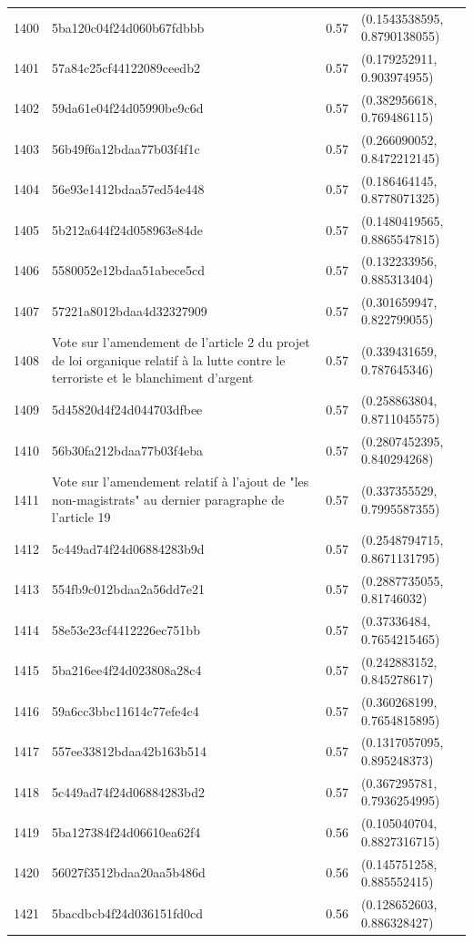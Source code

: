 \begin{table}[ht]
\begin{tabular}{rlrl}
  1400 & 5ba120c04f24d060b67fdbbb & 0.57 & (0.1543538595, 0.8790138055) \\ 
  1401 & 57a84c25cf44122089ceedb2 & 0.57 & (0.179252911, 0.903974955) \\ 
  1402 & 59da61e04f24d05990be9c6d & 0.57 & (0.382956618, 0.769486115) \\ 
  1403 & 56b49f6a12bdaa77b03f4f1c & 0.57 & (0.266090052, 0.8472212145) \\ 
  1404 & 56e93e1412bdaa57ed54e448 & 0.57 & (0.186464145, 0.8778071325) \\ 
  1405 & 5b212a644f24d058963e84de & 0.57 & (0.1480419565, 0.8865547815) \\ 
  1406 & 5580052e12bdaa51abece5cd & 0.57 & (0.132233956, 0.885313404) \\ 
  1407 & 57221a8012bdaa4d32327909 & 0.57 & (0.301659947, 0.822799055) \\ 
  1408 & Vote sur l'amendement de l'article 2 du projet de loi organique relatif à la lutte contre le terroriste et le blanchiment d'argent & 0.57 & (0.339431659, 0.787645346) \\ 
  1409 & 5d45820d4f24d044703dfbee & 0.57 & (0.258863804, 0.8711045575) \\ 
  1410 & 56b30fa212bdaa77b03f4eba & 0.57 & (0.2807452395, 0.840294268) \\ 
  1411 & Vote sur l'amendement relatif à l'ajout de "les non-magistrats" au dernier paragraphe de l'article 19 & 0.57 & (0.337355529, 0.7995587355) \\ 
  1412 & 5c449ad74f24d06884283b9d & 0.57 & (0.2548794715, 0.8671131795) \\ 
  1413 & 554fb9c012bdaa2a56dd7e21 & 0.57 & (0.2887735055, 0.81746032) \\ 
  1414 & 58e53e23cf4412226ec751bb & 0.57 & (0.37336484, 0.7654215465) \\ 
  1415 & 5ba216ee4f24d023808a28c4 & 0.57 & (0.242883152, 0.845278617) \\ 
  1416 & 59a6cc3bbc11614c77efe4c4 & 0.57 & (0.360268199, 0.7654815895) \\ 
  1417 & 557ee33812bdaa42b163b514 & 0.57 & (0.1317057095, 0.895248373) \\ 
  1418 & 5c449ad74f24d06884283bd2 & 0.57 & (0.367295781, 0.7936254995) \\ 
  1419 & 5ba127384f24d06610ea62f4 & 0.56 & (0.105040704, 0.8827316715) \\ 
  1420 & 56027f3512bdaa20aa5b486d & 0.56 & (0.145751258, 0.885552415) \\ 
  1421 & 5bacdbcb4f24d036151fd0cd & 0.56 & (0.128652603, 0.886328427) \\ 

\end{tabular}
\end{table}
